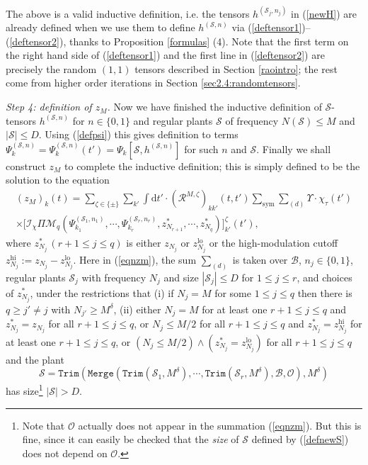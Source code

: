 \documentclass[11 pt,reqno]{amsart}
\theoremstyle{definition}
\theoremstyle{remark}
\numberwithin{equation}{section}
\newcommand{\Sc}{\mathcal{S}}
\newcommand{\Ic}{\mathcal{I}}
\renewcommand{\Mc}{\mathcal{M}}
\newcommand{\Bs}{\mathscr{B}}
\newcommand{\Os}{\mathscr{O}}
\newcommand{\Rs}{\mathscr{R}}
\begin{document}
{The above is a valid inductive definition, i.e. the tensors $h^{(\Sc_j,n_j)}$ in (\ref{newH}) are already defined when we use them to define $h^{(\Sc,n)}$ via (\ref{deftensor1})--(\ref{deftensor2}), thanks to Proposition \ref{formulas} (4). Note that the first term on the right hand side of (\ref{deftensor1}) and the first line in (\ref{deftensor2}) are precisely the random $(1,1)$ tensors described in Section \ref{raointro}; the rest come from higher order iterations in Section \ref{sec2.4:randomtensors}.

\emph{Step 4: definition of $z_M$.} Now we have finished the inductive definition of $\Sc$-tensors $h^{(\Sc,n)}$ for $n\in\{0,1\}$ and regular plants $\Sc$ of frequency $N(\Sc)\leq M$ and $|\Sc|\leq D$. Using (\ref{defpsi}) this gives definition to terms $\Psi_k^{(\Sc,n)}=\Psi_k^{(\Sc,n)}(t')=\Psi_k[\Sc,h^{(\Sc,n)}]$ for such $n$ and $\Sc$. Finally we shall construct $z_M$ to complete the inductive definition; this is simply defined to be the solution to the equation 
\begin{multline}\label{eqnzm}(z_M)_k(t)=\sum_{\zeta\in\{\pm\}}\sum_{k'}\int\mathrm{d}t'\cdot(\Rs^{M,\zeta})_{kk'}(t,t')\sum_{\mathrm{sym}}\sum_{(d)}\Upsilon\cdot\chi_\tau(t')\\\times\big[\Ic_\chi\Pi\Mc_q(\Psi_{k_1}^{(\Sc_1,n_1)},\cdots,\Psi_{k_r}^{(\Sc_r,n_r)},z_{N_{r+1}}^*,\cdots,z_{N_q}^*)\big]_{k'}^\zeta(t'),
\end{multline} where $z_{N_j}^*\,(r+1\leq j\leq q)$ is either $z_{N_j}$ or $z_{N_j}^{\mathrm{lo}}$ or the high-modulation cutoff $z_{N_j}^{\mathrm{hi}}:=z_{N_j}-z_{N_j}^{\mathrm{lo}}$. Here in (\ref{eqnzm}), the sum $\sum_{(d)}$ is taken over $\Bs$, $n_j\in\{0,1\}$, regular plants $\Sc_j$ with frequency $N_j$ and size $|\Sc_j|\leq D$ for $1\leq j\leq r$, and choices of $z_{N_j}^*$, under the restrictions that (i) if $N_j=M$ for some $1\leq j\leq q$ then there is $q\geq j'\neq j$ with $N_{j'}\geq M^\delta$, (ii) either $N_j=M$ for at least one $r+1\leq j\leq q$ and $z_{N_j}^*=z_{N_j}$ for all $r+1\leq j\leq q$, or $N_j\leq M/2$ for all $r+1\leq j\leq q$ and $z_{N_j}^*=z_{N_j}^{\mathrm{hi}}$ for at least one $r+1\leq j\leq q$, or $(N_j\leq M/2)\wedge(z_{N_j}^*=z_{N_j}^{\mathrm{lo}})$ for all $r+1\leq j\leq q$ and the plant
\begin{equation}\label{defnewS}\Sc=\mathtt{Trim}(\mathtt{Merge}(\mathtt{Trim}(\Sc_1,M^\delta),\cdots,\mathtt{Trim}(\Sc_r,M^\delta),\Bs,\Os),M^\delta)\end{equation} has size\footnote{Note that $\Os$ actually does not appear in the summation (\ref{eqnzm}). But this is fine, since it can easily be checked that the \emph{size} of $\Sc$ defined by (\ref{defnewS}) does not depend on $\Os$.} $|\Sc|>D$.

}
\end{document}
